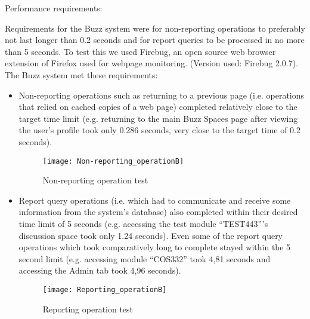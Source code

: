 \item Performance requirements:

Requirements for the Buzz system were for non-reporting operations to preferably not last longer than 0.2 seconds and for report queries to be processed in no more than 5 seconds.
To test this we used Firebug, an open source web browser extension of Firefox used for webpage monitoring. (Version used: Firebug 2.0.7).
The Buzz system met these requirements:
\begin{itemize}
\item Non-reporting operations such as returning to a previous page (i.e. operations that relied on cached copies of a web page) completed relatively close to the target time limit (e.g. returning to the main Buzz Spaces page after viewing the user’s profile took only 0.286 seconds, very close to the target time of 0.2 seconds).

\begin{figure}[h!]
  \centering
    \texttt{[image: Non-reporting\_operationB]}
    \caption{Non-reporting operation test}
\end{figure}

\item Report query operations (i.e. which had to communicate and receive some information from the system’s database) also completed within their desired time limit of 5 seconds (e.g. accessing the test module “TEST443”’s discussion space took only 1.24 seconds). Even some of the report query operations which took comparatively long to complete stayed within the 5 second limit (e.g. accessing module “COS332” took 4,81 seconds and accessing the Admin tab took 4,96 seconds).

\begin{figure}[h!]
  \centering
    \texttt{[image: Reporting\_operationB]}
    \caption{Reporting operation test}
\end{figure}

\end{itemize}	
